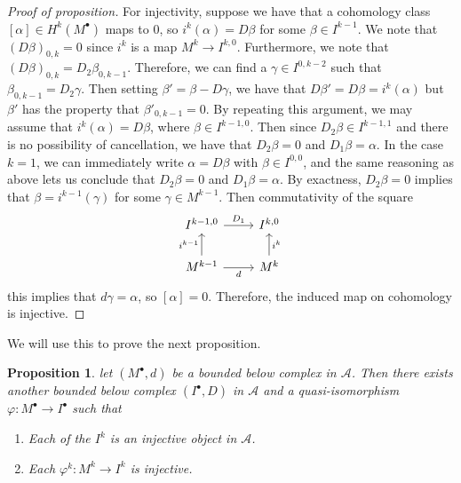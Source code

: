\documentclass[psamsfonts, 12pt]{amsart}
\newtheorem{prop}[thm]{Proposition}
\theoremstyle{definition}
\theoremstyle{remark}
\begin{document}
\begin{proof}[Proof of proposition]
For injectivity, suppose we have that a cohomology class $[\alpha] \in H^k(M^\bullet)$
maps to $0$, so $i^k(\alpha) = D\beta$ for some $\beta \in I^{k-1}$. We note
that $(D\beta)_{0,k} = 0$ since $i^k$ is a map $M^k \to I^{k,0}$. Furthermore,
we note that $(D\beta)_{0,k} = D_2\beta_{0,k-1}$. Therefore, we can find a
$\gamma \in I^{0,k-2}$ such that $\beta_{0,k-1} = D_2\gamma$. Then setting
$\beta' = \beta - D\gamma$, we have that $D\beta' = D\beta = i^k(\alpha)$ but
$\beta'$ has the property that $\beta'_{0,k-1} = 0$. By repeating this argument,
we may assume that $i^k(\alpha) = D\beta$, where $\beta \in I^{k-1,0}$. Then
since $D_2\beta \in I^{k-1,1}$ and there is no possibility of cancellation, we have
that $D_2\beta = 0$ and $D_1\beta = \alpha$. In the case $k=1$,
we can immediately write $\alpha = D\beta$ with $\beta \in I^{0,0}$, and the
same reasoning as above lets us conclude that $D_2\beta = 0$ and $D_1\beta = \alpha$.
By exactness, $D_2\beta = 0$ implies that $\beta = i^{k-1}(\gamma)$ for some
$\gamma \in M^{k-1}$. Then commutativity of the square
\[\begin{tikzcd}
I^{k-1,0} \ar[r, "D_1"] & I^{k,0} \\
M^{k-1} \ar[u, "i^{k-1}"]\ar[r,"d"'] & M^k \ar[u, "i^k"']
\end{tikzcd}\]
this implies that $d\gamma = \alpha$, so $[\alpha] = 0$. Therefore, the
induced map on cohomology is injective.
\end{proof}
%
We will use this to prove the next proposition.
%
\begin{prop}
let $(M^\bullet,d)$ be a bounded below complex in $\mathcal{A}$. Then there exists
another bounded below complex $(I^\bullet,D)$ in $\mathcal{A}$ and a quasi-isomorphism
$\varphi : M^\bullet \to I^\bullet$ such that
\begin{enumerate}
  \item Each of the $I^k$ is an injective object in $\mathcal{A}$.
  \item Each $\varphi^k : M^k \to I^k$ is injective.
\end{enumerate}
\end{prop}
%
\end{document}
